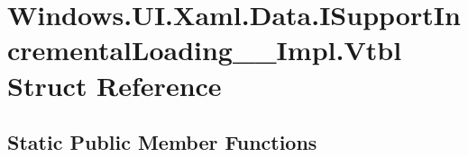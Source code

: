 \hypertarget{struct_windows_1_1_u_i_1_1_xaml_1_1_data_1_1_i_support_incremental_loading_____impl_1_1_vtbl}{}\section{Windows.\+U\+I.\+Xaml.\+Data.\+I\+Support\+Incremental\+Loading\+\_\+\+\_\+\+Impl.\+Vtbl Struct Reference}
\label{struct_windows_1_1_u_i_1_1_xaml_1_1_data_1_1_i_support_incremental_loading_____impl_1_1_vtbl}
\subsection*{Static Public Member Functions}
